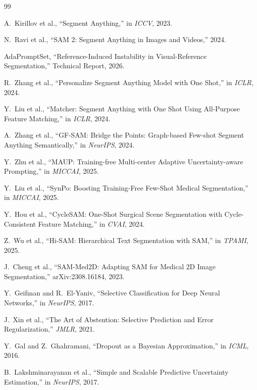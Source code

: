 \documentclass[10pt,twocolumn,letterpaper]{article}
\begin{document}
{\small

\begin{thebibliography}{99}

A.~Kirillov et al., ``Segment Anything,'' in \emph{ICCV}, 2023.

N.~Ravi et al., ``SAM 2: Segment Anything in Images and Videos,'' 2024.

AdaPromptSet, ``Reference-Induced Instability in Visual-Reference
Segmentation,'' Technical Report, 2026.

R.~Zhang et al., ``Personalize Segment Anything Model with One Shot,'' in
\emph{ICLR}, 2024.

Y.~Liu et al., ``Matcher: Segment Anything with One Shot Using All-Purpose
Feature Matching,'' in \emph{ICLR}, 2024.

A.~Zhang et al., ``GF-SAM: Bridge the Points: Graph-based Few-shot Segment
Anything Semantically,'' in \emph{NeurIPS}, 2024.

Y.~Zhu et al., ``MAUP: Training-free Multi-center Adaptive
Uncertainty-aware Prompting,'' in \emph{MICCAI}, 2025.

Y.~Liu et al., ``SynPo: Boosting Training-Free Few-Shot Medical
Segmentation,'' in \emph{MICCAI}, 2025.

Y.~Hou et al., ``CycleSAM: One-Shot Surgical Scene Segmentation with
Cycle-Consistent Feature Matching,'' in \emph{CVAI}, 2024.

Z.~Wu et al., ``Hi-SAM: Hierarchical Text Segmentation with SAM,'' in
\emph{TPAMI}, 2025.

J.~Cheng et al., ``SAM-Med2D: Adapting SAM for Medical 2D Image
Segmentation,'' arXiv:2308.16184, 2023.

Y.~Geifman and R.~El-Yaniv, ``Selective Classification for Deep Neural
Networks,'' in \emph{NeurIPS}, 2017.

J.~Xin et al., ``The Art of Abstention: Selective Prediction and Error
Regularization,'' \emph{JMLR}, 2021.

Y.~Gal and Z.~Ghahramani, ``Dropout as a Bayesian Approximation,'' in
\emph{ICML}, 2016.

B.~Lakshminarayanan et al., ``Simple and Scalable Predictive Uncertainty
Estimation,'' in \emph{NeurIPS}, 2017.


\end{thebibliography}}
\end{document}
